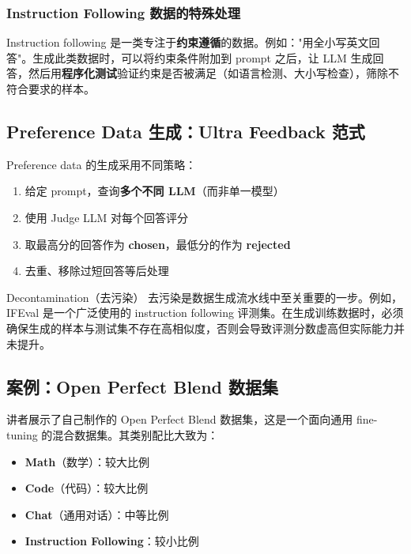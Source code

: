 \documentclass[a4paper]{article}
\begin{document}
\subsubsection{Instruction Following 数据的特殊处理}

Instruction following 是一类专注于\textbf{约束遵循}的数据。例如："用全小写英文回答"。生成此类数据时，可以将约束条件附加到 prompt 之后，让 LLM 生成回答，然后用\textbf{程序化测试}验证约束是否被满足（如语言检测、大小写检查），筛除不符合要求的样本。

\subsection{Preference Data 生成：Ultra Feedback 范式}

Preference data 的生成采用不同策略：

\begin{enumerate}
    \item 给定 prompt，查询\textbf{多个不同 LLM}（而非单一模型）
    \item 使用 Judge LLM 对每个回答评分
    \item 取最高分的回答作为 \textbf{chosen}，最低分的作为 \textbf{rejected}
    \item 去重、移除过短回答等后处理
\end{enumerate}

\begin{knowledgebox}{Decontamination（去污染）}
去污染是数据生成流水线中至关重要的一步。例如，IFEval 是一个广泛使用的 instruction following 评测集。在生成训练数据时，必须确保生成的样本与测试集不存在高相似度，否则会导致评测分数虚高但实际能力并未提升。
\end{knowledgebox}

\subsection{案例：Open Perfect Blend 数据集}

讲者展示了自己制作的 Open Perfect Blend 数据集，这是一个面向通用 fine-tuning 的混合数据集。其类别配比大致为：

\begin{itemize}
    \item \textbf{Math}（数学）：较大比例
    \item \textbf{Code}（代码）：较大比例
    \item \textbf{Chat}（通用对话）：中等比例
    \item \textbf{Instruction Following}：较小比例
\end{itemize}
\end{document}
